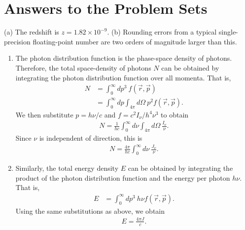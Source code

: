 
\chapter{Answers to the Problem Sets}

\newslide
\problemset

\newslide

\begin{problem}
(a) The redshift is $z = 1.82 \times 10^{-9}$. (b) Rounding errors from a
typical single-precision floating-point number are two orders
of magnitude larger than this.
\end{problem}

\newslide

\begin{problem}
\begin{enumerate}
\item[(a)] The photon distribution function is the phase-space density
  of photons. Therefore, the total space-density of photons $N$ can be
  obtained by integrating the photon distribution function over all
  momenta. That is,
\begin{align}
N &= \int_0^\infty\!\!\!dp^3\:f(\vec r,\vec p)\\
  &= \int_0^\infty\!\!\!dp \int_{4\pi}\!\!\! d\Omega\: p^2 f(\vec r,\vec p).
\end{align}
We then substitute $p = h\nu/c$ and $f = c^2I_\nu/h^4\nu^3$ to obtain
\begin{align}
N = \frac{1}{h c} 
\int_0^\infty\!\!\!d\nu\int_{4\pi}\!\!\!d\Omega\:\frac{I_\nu}{\nu}.
\end{align}
Since $\nu$ is independent of direction, this is
\begin{align}
N = \frac{4\pi}{h c} \int_0^\infty\!\!\!d\nu\:\frac{J_\nu}{\nu}.
\end{align}
\item[(b)] Similarly, the total energy density $E$ can be obtained by
  integrating the product of the photon distribution function and the
  energy per photon $h\nu$. That is,
\begin{align}
E &= \int_0^\infty\!\!\!dp^3\:h\nu f(\vec r,\vec p).
\end{align}
Using the same substitutions as above, we obtain
\begin{align}
E = \frac{4\pi J}{c}.
\end{align}

\end{enumerate}
\end{problem}

